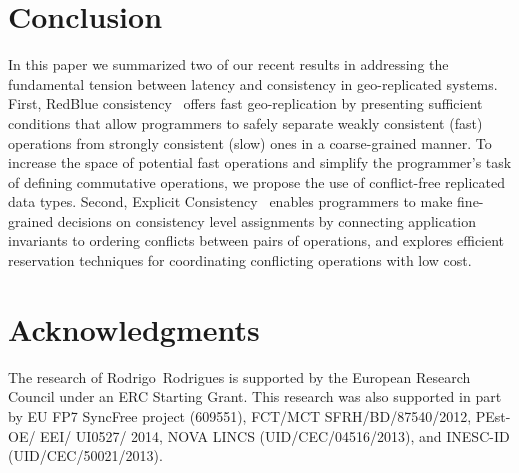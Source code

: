 \section{Conclusion}
\label{sec:conc}

In this paper we summarized two of our recent results in addressing the fundamental tension
between latency and consistency in geo-replicated systems. First,
RedBlue consistency~\cite{Li2012RedBlue} offers fast geo-replication by
presenting sufficient conditions that allow programmers to safely separate
weakly consistent (fast) operations from strongly consistent (slow) ones in
a coarse-grained manner. To increase the space of potential fast operations
and simplify the programmer's task of defining commutative operations, 
we propose the use of conflict-free replicated data types. Second,  Explicit Consistency~\cite{Balegas2015Indigo}
enables programmers to make fine-grained decisions on consistency level assignments
by connecting application invariants to ordering conflicts between pairs of operations,
and explores efficient reservation techniques for coordinating conflicting operations with
low cost.





\section*{Acknowledgments}

The research of Rodrigo\ Rodrigues is supported by the European Research Council under an ERC Starting Grant.
This research was also supported in part 
    by EU FP7 SyncFree project (609551),
    FCT/MCT SFRH/BD/87540/2012, PEst-OE/ EEI/ UI0527/ 2014, 
NOVA LINCS (UID/CEC/04516/2013), and INESC-ID (UID/CEC/50021/2013).
